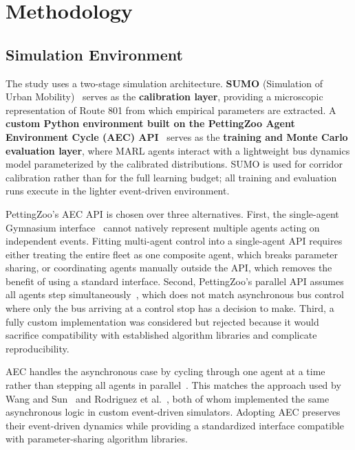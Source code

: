 \section{Methodology}

\subsection{Simulation Environment}

The study uses a two-stage simulation architecture. \textbf{SUMO} (Simulation of Urban Mobility)~\cite{Lopez2018SUMO} serves as the \textbf{calibration layer}, providing a microscopic representation of Route 801 from which empirical parameters are extracted. A \textbf{custom Python environment built on the PettingZoo Agent Environment Cycle (AEC) API}~\cite{Terry2021PettingZoo} serves as the \textbf{training and Monte Carlo evaluation layer}, where MARL agents interact with a lightweight bus dynamics model parameterized by the calibrated distributions. SUMO is used for corridor calibration rather than for the full learning budget; all training and evaluation runs execute in the lighter event-driven environment.

PettingZoo's AEC API is chosen over three alternatives. First, the single-agent Gymnasium interface~\cite{Towers2024Gymnasium} cannot natively represent multiple agents acting on independent events. Fitting multi-agent control into a single-agent API requires either treating the entire fleet as one composite agent, which breaks parameter sharing, or coordinating agents manually outside the API, which removes the benefit of using a standard interface. Second, PettingZoo's parallel API assumes all agents step simultaneously~\cite{Terry2021PettingZoo}, which does not match asynchronous bus control where only the bus arriving at a control stop has a decision to make. Third, a fully custom implementation was considered but rejected because it would sacrifice compatibility with established algorithm libraries and complicate reproducibility. 

AEC handles the asynchronous case by cycling through one agent at a time rather than stepping all agents in parallel~\cite{Terry2021PettingZoo}. This matches the approach used by Wang and Sun~\cite{Wangsun} and Rodriguez et al.~\cite{Rodriguez2023Cooperative}, both of whom implemented the same asynchronous logic in custom event-driven simulators. Adopting AEC preserves their event-driven dynamics while providing a standardized interface compatible with parameter-sharing algorithm libraries.

